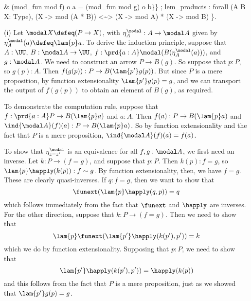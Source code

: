 \begin{coqdoccode}
\begin{coqdoccomment}
\&\coqdoceol
\coqdocindent{5.50em}
(mod\_fun\coqdocindent{0.50em}
mod\coqdocindent{0.50em}
f)\coqdocindent{0.50em}
o\coqdocindent{0.50em}
a\coqdocindent{0.50em}
\coqdoceol
\coqdocindent{5.50em}
=\coqdocindent{0.50em}
(mod\_fun\coqdocindent{0.50em}
mod\coqdocindent{0.50em}
g)\coqdocindent{0.50em}
o\coqdocindent{0.50em}
b\}\}\coqdocindent{0.50em}
;\coqdoceol
\coqdocindent{3.00em}
lem\_products\coqdocindent{0.50em}
:\coqdocindent{0.50em}
forall\coqdocindent{0.50em}
(A\coqdocindent{0.50em}
B\coqdocindent{0.50em}
X:\coqdocindent{0.50em}
Type),\coqdoceol
\coqdocindent{4.00em}
(X\coqdocindent{0.50em}
->\coqdocindent{0.50em}
mod\coqdocindent{0.50em}
(A\coqdocindent{0.50em}
*\coqdocindent{0.50em}
B))\coqdocindent{0.50em}
<\~{}>\coqdocindent{0.50em}
(X\coqdocindent{0.50em}
->\coqdocindent{0.50em}
mod\coqdocindent{0.50em}
A)\coqdocindent{0.50em}
*\coqdocindent{0.50em}
(X\coqdocindent{0.50em}
->\coqdocindent{0.50em}
mod\coqdocindent{0.50em}
B)\coqdocindent{7.50em}
\coqdoceol
\coqdocindent{2.00em}
\}.\coqdoceol
\end{coqdoccomment}
\coqdoceol
\coqdocemptyline
\end{coqdoccode}
(i) Let $\modal X \defeq (P \to X)$, with $\eta^{\modal}_{A} : A \to
\modal A$ given by $\eta^{\modal}_{A}(a) \defeq \lam{p}a$.  To derive the
induction principle, suppose that $A : \UU$, $B : \modal A \to \UU$, $f :
\prd{a:A}\modal(B(\eta^{\modal}_{A}(a)))$, and $g : \modal A$.  We need to
construct an arrow $P \to B(g)$.  So suppose that $p : P$, so $g(p) : A$.  Then
$f(g(p)) : P \to B(\lam{p'}g(p))$.  But since $P$ is a mere proposition, by
function extensionality $\lam{p'}g(p) = g$, and we can transport the output of
$f(g(p))$ to obtain an element of $B(g)$, as required.


To demonstrate the computation rule, suppose that $f : \prd{a:A} P \to
B(\lam{p}a)$ and $a : A$.  Then $f(a) : P \to B(\lam{p}a)$ and $\ind{\modal
A}(f)(a) : P \to B(\lam{p}a)$.  So by function extensionality and the fact that
$P$ is a mere proposition, $\ind{\modal A}(f)(a) = f(a)$.


To show that $\eta^{\modal}_{z = z'}$ is an equivalence for all $f, g : \modal
A$, we first need an inverse.  Let $k : P \to (f = g)$, and suppose that $p :
P$.  Then $k(p) : f = g$, so $\lam{p}\happly(k(p)) : f \sim g$.  By function
extensionality, then, we have $f = g$.  These are clearly quasi-inverses.  If
$q : f = g$, then we want to show that
\[
  \funext(\lam{p}\happly(q, p)) = q
\]
which follows immediately from the fact that $\funext$ and $\happly$ are
inverses.  For the other direction, suppose that $k : P \to (f = g)$.  Then we
need to show that
\[
  \lam{p}\funext(\lam{p'}\happly(k(p'), p')) = k
\]
which we do by function extensionality.  Supposing that $p : P$, we need to
show that
\[
  \lam{p'}\happly(k(p'), p')) = \happly(k(p))
\]
and this follows from the fact that $P$ is a mere proposition, just as we
showed that $\lam{p'}g(p) = g$.



